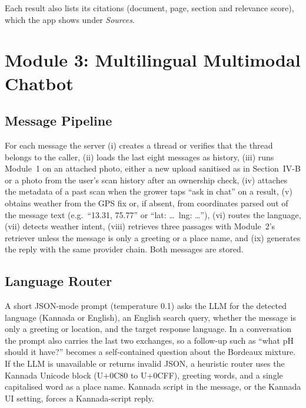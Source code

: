 Each result also lists its citations (document, page, section and relevance score), which the app shows under
\emph{Sources}.

\section{Module 3: Multilingual Multimodal Chatbot}
\subsection{Message Pipeline}
For each message the server (i) creates a thread or verifies that the thread belongs to the caller, (ii) loads the last
eight messages as history, (iii) runs Module~1 on an attached photo, either a new upload sanitised as in Section~IV-B
or a photo from the user's scan history after an ownership check, (iv) attaches the metadata of a past scan when the
grower taps ``ask in chat'' on a result, (v) obtains weather from the GPS fix or, if absent, from coordinates parsed out
of the message text (e.g.\ ``13.31, 75.77'' or ``lat: \ldots\ lng: \ldots''), (vi) routes the language, (vii) detects
weather intent, (viii) retrieves three passages with Module~2's retriever unless the message is only a greeting or a
place name, and (ix) generates the reply with the same provider chain. Both messages are stored.

\subsection{Language Router}
A short JSON-mode prompt (temperature 0.1) asks the LLM for the detected language (Kannada or English), an
English search query, whether the message is only a greeting or location, and the target response language. In a
conversation the prompt also carries the last two exchanges, so a follow-up such as ``what pH should it have?'' becomes
a self-contained question about the Bordeaux mixture. If the LLM
is unavailable or returns invalid JSON, a heuristic router uses the Kannada Unicode block (U+0C80 to U+0CFF), greeting
words, and a single capitalised word as a place name. Kannada script in the message, or
the Kannada UI setting, forces a Kannada-script reply.

